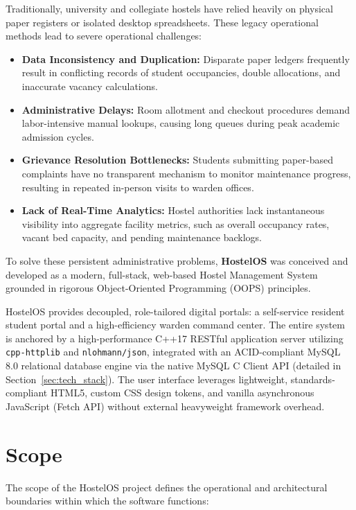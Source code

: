 \documentclass[12pt,a4paper]{article}
\begin{document}
Traditionally, university and collegiate hostels have relied heavily on physical paper registers or isolated desktop spreadsheets. These legacy operational methods lead to severe operational challenges:
\begin{itemize}
    \item \textbf{Data Inconsistency and Duplication:} Disparate paper ledgers frequently result in conflicting records of student occupancies, double allocations, and inaccurate vacancy calculations.
    \item \textbf{Administrative Delays:} Room allotment and checkout procedures demand labor-intensive manual lookups, causing long queues during peak academic admission cycles.
    \item \textbf{Grievance Resolution Bottlenecks:} Students submitting paper-based complaints have no transparent mechanism to monitor maintenance progress, resulting in repeated in-person visits to warden offices.
    \item \textbf{Lack of Real-Time Analytics:} Hostel authorities lack instantaneous visibility into aggregate facility metrics, such as overall occupancy rates, vacant bed capacity, and pending maintenance backlogs.
\end{itemize}

To solve these persistent administrative problems, \textbf{HostelOS} was conceived and developed as a modern, full-stack, web-based Hostel Management System grounded in rigorous Object-Oriented Programming (OOPS) principles. 

HostelOS provides decoupled, role-tailored digital portals: a self-service resident student portal and a high-efficiency warden command center. The entire system is anchored by a high-performance C++17 RESTful application server utilizing \texttt{cpp-httplib} and \texttt{nlohmann/json}, integrated with an ACID-compliant MySQL 8.0 relational database engine via the native MySQL C Client API (detailed in Section~\ref{sec:tech_stack}). The user interface leverages lightweight, standards-compliant HTML5, custom CSS design tokens, and vanilla asynchronous JavaScript (Fetch API) without external heavyweight framework overhead.

\section{Scope}
\label{sec:scope}
The scope of the HostelOS project defines the operational and architectural boundaries within which the software functions:
\end{document}
